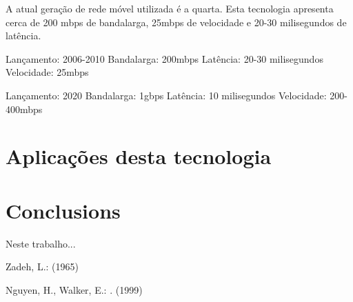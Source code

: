 \documentclass{llncs}
\begin{document}
A atual geração de rede móvel utilizada é a quarta. Esta tecnologia apresenta cerca de 200 mbps de bandalarga, 25mbps de velocidade e 20-30 milisegundos de latência. 

Lançamento: 2006-2010
Bandalarga: 200mbps
Latência: 20-30 milisegundos
Velocidade: 25mbps

Lançamento: 2020
Bandalarga: 1gbps
Latência: 10 milisegundos
Velocidade: 200-400mbps

\section{Aplicações desta tecnologia}

\section{Conclusions}
Neste trabalho...

\begin{thebibliography}{1}
Zadeh, L.:
 (1965)

Nguyen, H., Walker, E.:
.
 (1999)
\end{thebibliography}
\end{document}
